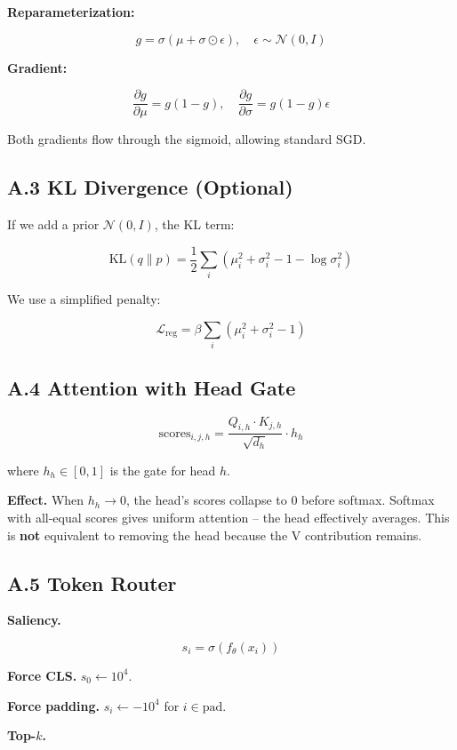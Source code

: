 \textbf{Reparameterization:}

\[
g = \sigma(\mu + \sigma \odot \epsilon), \quad \epsilon \sim \mathcal{N}(0, I)
\tag{A.4}
\]

\textbf{Gradient:}

\[
\frac{\partial g}{\partial \mu} = g(1 - g), \quad
\frac{\partial g}{\partial \sigma} = g(1 - g) \epsilon
\tag{A.5}
\]

Both gradients flow through the sigmoid, allowing standard SGD.

\subsection{A.3 KL Divergence (Optional)}

If we add a prior $\mathcal{N}(0, I)$, the KL term:

\[
\text{KL}(q \| p) = \frac{1}{2} \sum_i \left(\mu_i^2 + \sigma_i^2 - 1 - \log \sigma_i^2\right)
\tag{A.6}
\]

We use a simplified penalty:

\[
\mathcal{L}_\text{reg} = \beta \sum_i (\mu_i^2 + \sigma_i^2 - 1)
\tag{A.7}
\]

\subsection{A.4 Attention with Head Gate}

\[
\text{scores}_{i, j, h} = \frac{Q_{i, h} \cdot K_{j, h}}{\sqrt{d_h}} \cdot h_h
\tag{A.8}
\]

where $h_h \in [0, 1]$ is the gate for head $h$.

\textbf{Effect.} When $h_h \to 0$, the head's scores collapse to 0 before softmax. 
Softmax with all-equal scores gives uniform attention -- the head 
effectively averages. This is \textbf{not} equivalent to removing the head 
because the V contribution remains.

\subsection{A.5 Token Router}

\textbf{Saliency.}

\[
s_i = \sigma(f_\theta(x_i))
\tag{A.9}
\]

\textbf{Force CLS.} $s_0 \leftarrow 10^4$.

\textbf{Force padding.} $s_i \leftarrow -10^4$ for $i \in \text{pad}$.

\textbf{Top-$k$.}

